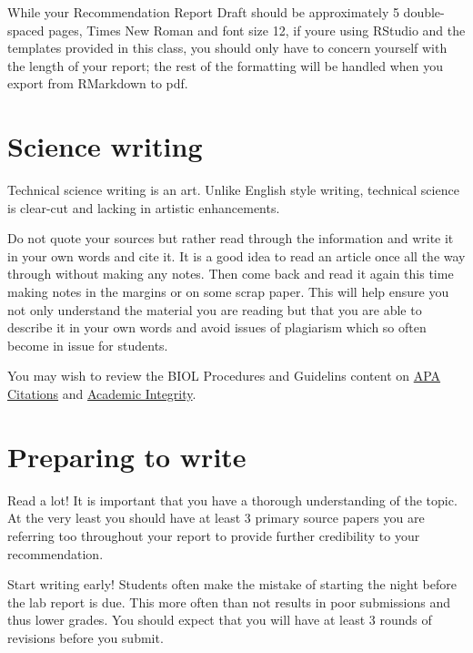 \documentclass[
]{book}
\begin{document}
While your Recommendation Report Draft should be approximately 5 double-spaced pages, Times New Roman and font size 12, if you\textquotesingle re using RStudio and the templates provided in this class, you should only have to concern yourself with the length of your report; the rest of the formatting will be handled when you export from RMarkdown to pdf.

\hypertarget{science-writing}{%
\section*{Science writing}\label{science-writing}}

Technical science writing is an art. Unlike English style writing, technical science is clear-cut and lacking in artistic enhancements.

Do not quote your sources but rather read through the information and write it in your own words and cite it. It is a good idea to read an article once all the way through without making any notes. Then come back and read it again this time making notes in the margins or on some scrap paper. This will help ensure you not only understand the material you are reading but that you are able to describe it in your own words and avoid issues of plagiarism which so often become in issue for students.

You may wish to review the BIOL Procedures and Guidelins content on \href{https://ubco-biology.github.io/Procedures-and-Guidelines/apa-citations.html}{APA Citations} and \href{https://ubco-biology.github.io/Procedures-and-Guidelines/academic-integrity.html}{Academic Integrity}.

\hypertarget{preparing-to-write}{%
\section*{Preparing to write}\label{preparing-to-write}}

Read a lot! It is important that you have a thorough understanding of the topic. At the very least you should have at least 3 primary source papers you are referring too throughout your report to provide further credibility to your recommendation.

Start writing early! Students often make the mistake of starting the night before the lab report is due. This more often than not results in poor submissions and thus lower grades. You should expect that you will have at least 3 rounds of revisions before you submit.
\end{document}
